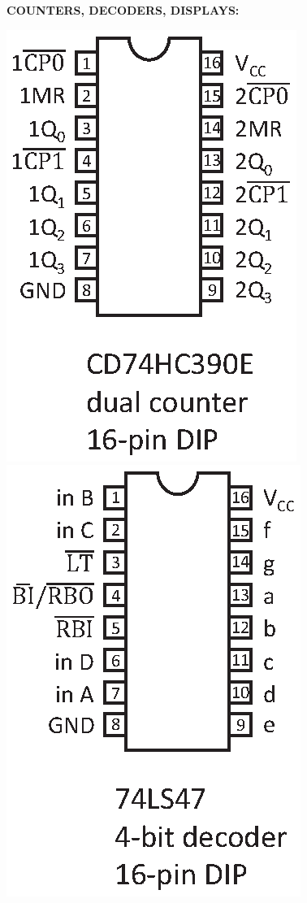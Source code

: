 
\medskip
\textbf{COUNTERS, DECODERS, DISPLAYS:}

\vspace{-0.15in}
\hspace{0.25in}
\includegraphics[scale=0.75]{appendices/pinouts/cd74hc390e.eps}
\hspace{-0.3in}
\includegraphics[scale=0.75]{appendices/pinouts/74LS47.eps}
